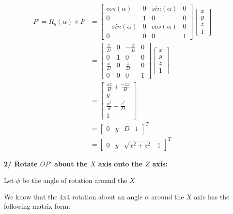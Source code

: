\documentclass[a4paper,10pt]{article}
\begin{document}
\begin{equation}
\left.\begin{aligned}
P' = R_y(\alpha) \times P 
&=
\begin{bmatrix}
	cos(\alpha)  & 0 & sin(\alpha) & 0 \\
	0 			 & 1 & 0		   & 0 \\
	-sin(\alpha) & 0 & cos(\alpha) & 0 \\
	0 			 & 0 & 0 		   & 1
\end{bmatrix}
\begin{bmatrix}
x \\ y \\ z \\ 1
\end{bmatrix}&\\
&=
\begin{bmatrix}
	\frac{z}{D}  & 0 & -\frac{x}{D} & 0 \\
	0 			 & 1 & 0		    & 0 \\
	\frac{x}{D}  & 0 & \frac{z}{D}  & 0 \\
	0 			 & 0 & 0 		    & 1
\end{bmatrix}
\begin{bmatrix}
x \\ y \\ z \\ 1
\end{bmatrix}&\\
&=
\begin{bmatrix}
\frac{xz}{D} + \frac{-zx}{D} \\
 y \\ 
 \frac{x^2}{d} + \frac{z^2}{D} \\ 
 1
\end{bmatrix}&\\
&=
\begin{bmatrix}
0 & y & D & 1
\end{bmatrix}^{T}&\\
&=
\begin{bmatrix}
0 & y & \sqrt{x^2 + z^2} & 1
\end{bmatrix}^{T}&\
\end{aligned}\right.
\end{equation}


\pagebreak
\noindent
\textbf{2/ Rotate $OP'$ about the $X$ axis onto the $Z$ axis:}


\bigskip \noindent
Let $\phi$ be the angle of rotation around the $X$.

\bigskip \noindent
We know that the 4x4 rotation about an angle $\alpha$ around the $X$ axis has the following matrix form:
\end{document}
